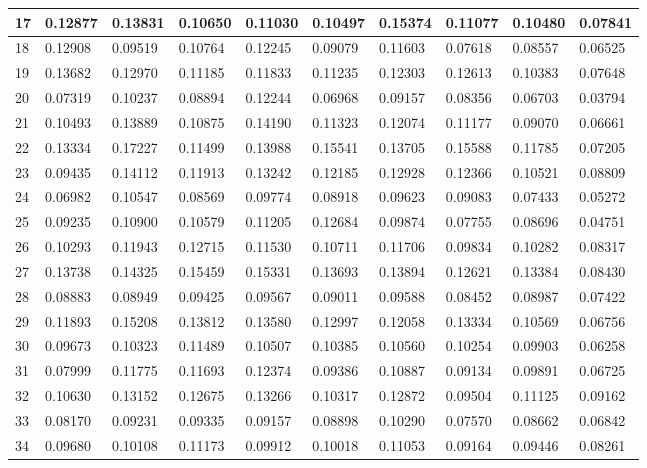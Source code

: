 \begin{table}[H]
{\begin{tabular}{|l|l|l|l|l|l|l|l|l|l|}
        17 & 0.12877 & 0.13831 & 0.10650 & 0.11030 & 0.10497 & 0.15374 & 0.11077 & 0.10480 & 0.07841 \\ \hline
        18 & 0.12908 & 0.09519 & 0.10764 & 0.12245 & 0.09079 & 0.11603 & 0.07618 & 0.08557 & 0.06525 \\ \hline
        19 & 0.13682 & 0.12970 & 0.11185 & 0.11833 & 0.11235 & 0.12303 & 0.12613 & 0.10383 & 0.07648 \\ \hline
        20 & 0.07319 & 0.10237 & 0.08894 & 0.12244 & 0.06968 & 0.09157 & 0.08356 & 0.06703 & 0.03794 \\ \hline
        21 & 0.10493 & 0.13889 & 0.10875 & 0.14190 & 0.11323 & 0.12074 & 0.11177 & 0.09070 & 0.06661 \\ \hline
        22 & 0.13334 & 0.17227 & 0.11499 & 0.13988 & 0.15541 & 0.13705 & 0.15588 & 0.11785 & 0.07205 \\ \hline
        23 & 0.09435 & 0.14112 & 0.11913 & 0.13242 & 0.12185 & 0.12928 & 0.12366 & 0.10521 & 0.08809 \\ \hline
        24 & 0.06982 & 0.10547 & 0.08569 & 0.09774 & 0.08918 & 0.09623 & 0.09083 & 0.07433 & 0.05272 \\ \hline
        25 & 0.09235 & 0.10900 & 0.10579 & 0.11205 & 0.12684 & 0.09874 & 0.07755 & 0.08696 & 0.04751 \\ \hline
        26 & 0.10293 & 0.11943 & 0.12715 & 0.11530 & 0.10711 & 0.11706 & 0.09834 & 0.10282 & 0.08317 \\ \hline
        27 & 0.13738 & 0.14325 & 0.15459 & 0.15331 & 0.13693 & 0.13894 & 0.12621 & 0.13384 & 0.08430 \\ \hline
        28 & 0.08883 & 0.08949 & 0.09425 & 0.09567 & 0.09011 & 0.09588 & 0.08452 & 0.08987 & 0.07422 \\ \hline
        29 & 0.11893 & 0.15208 & 0.13812 & 0.13580 & 0.12997 & 0.12058 & 0.13334 & 0.10569 & 0.06756 \\ \hline
        30 & 0.09673 & 0.10323 & 0.11489 & 0.10507 & 0.10385 & 0.10560 & 0.10254 & 0.09903 & 0.06258 \\ \hline
        31 & 0.07999 & 0.11775 & 0.11693 & 0.12374 & 0.09386 & 0.10887 & 0.09134 & 0.09891 & 0.06725 \\ \hline
        32 & 0.10630 & 0.13152 & 0.12675 & 0.13266 & 0.10317 & 0.12872 & 0.09504 & 0.11125 & 0.09162 \\ \hline
        33 & 0.08170 & 0.09231 & 0.09335 & 0.09157 & 0.08898 & 0.10290 & 0.07570 & 0.08662 & 0.06842 \\ \hline
        34 & 0.09680 & 0.10108 & 0.11173 & 0.09912 & 0.10018 & 0.11053 & 0.09164 & 0.09446 & 0.08261 \\ \hline

\end{tabular}}
\end{table}
